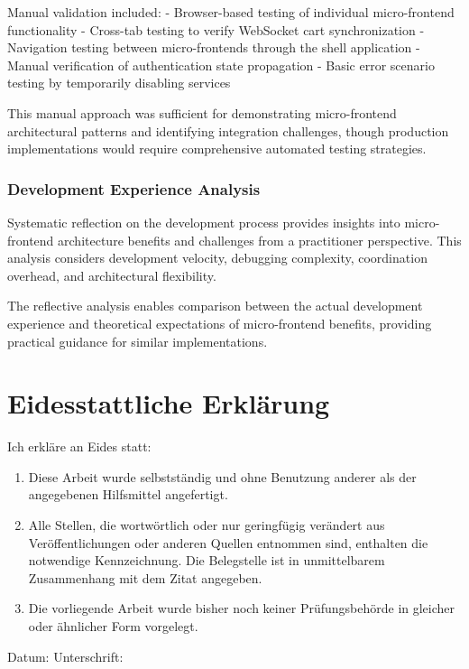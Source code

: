 \documentclass[12pt,a4paper]{report}
\begin{document}
Manual validation included:
- Browser-based testing of individual micro-frontend functionality
- Cross-tab testing to verify WebSocket cart synchronization
- Navigation testing between micro-frontends through the shell application
- Manual verification of authentication state propagation
- Basic error scenario testing by temporarily disabling services

This manual approach was sufficient for demonstrating micro-frontend architectural patterns and identifying integration challenges, though production implementations would require comprehensive automated testing strategies.

\subsection{Development Experience Analysis}

Systematic reflection on the development process provides insights into micro-frontend architecture benefits and challenges from a practitioner perspective. This analysis considers development velocity, debugging complexity, coordination overhead, and architectural flexibility.

The reflective analysis enables comparison between the actual development experience and theoretical expectations of micro-frontend benefits, providing practical guidance for similar implementations.

\chapter*{Eidesstattliche Erklärung}

Ich erkläre an Eides statt:

\begin{enumerate}
\item Diese Arbeit wurde selbstständig und ohne Benutzung anderer als der angegebenen Hilfsmittel angefertigt.

\item Alle Stellen, die wortwörtlich oder nur geringfügig verändert aus Veröffentlichungen oder anderen Quellen entnommen sind, enthalten die notwendige Kennzeichnung. Die Belegstelle ist in unmittelbarem Zusammenhang mit dem Zitat angegeben.

\item Die vorliegende Arbeit wurde bisher noch keiner Prüfungsbehörde in gleicher oder ähnlicher Form vorgelegt.
\end{enumerate}

\vspace{2cm}

\noindent
Datum: \underline{\hspace{4cm}} \hfill Unterschrift: \underline{\hspace{6cm}}
\end{document}
